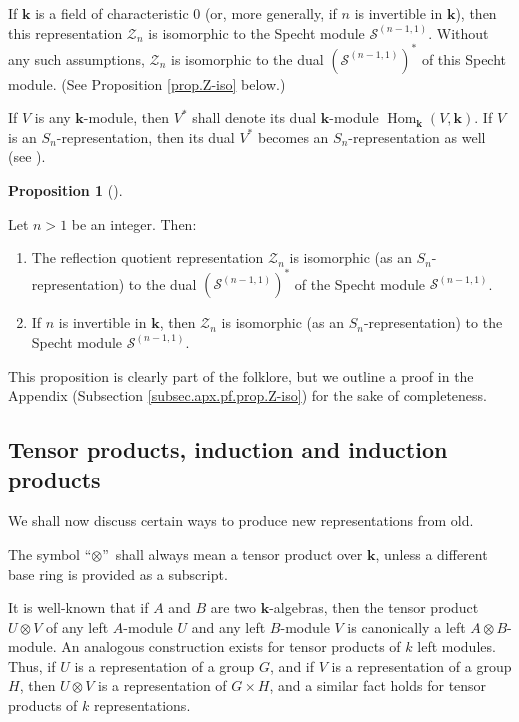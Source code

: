 \documentclass[numbers=enddot,12pt,final,onecolumn,notitlepage]{scrartcl}%
\theoremstyle{definition}
\newtheorem{prop}[theo]{Proposition}
\newenvironment{proposition}[1][]
{\begin{prop}[#1]\begin{leftbar}}
{\end{leftbar}\end{prop}}
\begin{document}
\begin{enumerate}
If $\mathbf{k}$ is a field of characteristic $0$ (or, more generally, if $n$
is invertible in $\mathbf{k}$), then this representation $\mathcal{Z}_{n}$ is
isomorphic to the Specht module $\mathcal{S}^{\left(  n-1,1\right)  }$.
Without any such assumptions, $\mathcal{Z}_{n}$ is isomorphic to the dual
$\left(  \mathcal{S}^{\left(  n-1,1\right)  }\right)  ^{\ast}$ of this Specht
module. (See Proposition \ref{prop.Z-iso} below.)
\end{enumerate}

If $V$ is any $\mathbf{k}$-module, then $V^{\ast}$ shall denote its dual
$\mathbf{k}$-module $\operatorname*{Hom}\nolimits_{\mathbf{k}}\left(
V,\mathbf{k}\right)  $. If $V$ is an $S_{n}$-representation, then its dual
$V^{\ast}$ becomes an $S_{n}$-representation as well (see \cite[\S 5.19.3]%
{sga}).

\begin{proposition}
\label{prop.Z-iso}Let $n>1$ be an integer. Then:

\begin{enumerate}
\item[\textbf{(a)}] The reflection quotient representation $\mathcal{Z}_{n}$
is isomorphic (as an $S_{n}$-representation) to the dual $\left(
\mathcal{S}^{\left(  n-1,1\right)  }\right)  ^{\ast}$ of the Specht module
$\mathcal{S}^{\left(  n-1,1\right)  }$.

\item[\textbf{(b)}] If $n$ is invertible in $\mathbf{k}$, then $\mathcal{Z}%
_{n}$ is isomorphic (as an $S_{n}$-representation) to the Specht module
$\mathcal{S}^{\left(  n-1,1\right)  }$.
\end{enumerate}
\end{proposition}

This proposition is clearly part of the folklore, but we outline a proof in
the Appendix (Subsection \ref{subsec.apx.pf.prop.Z-iso}) for the sake of completeness.

\subsection{Tensor products, induction and induction products}

We shall now discuss certain ways to produce new representations from old.

The symbol \textquotedblleft$\otimes$\textquotedblright\ shall always mean a
tensor product over $\mathbf{k}$, unless a different base ring is provided as
a subscript.

It is well-known that if $A$ and $B$ are two $\mathbf{k}$-algebras, then the
tensor product $U\otimes V$ of any left $A$-module $U$ and any left $B$-module
$V$ is canonically a left $A\otimes B$-module. An analogous construction
exists for tensor products of $k$ left modules. Thus, if $U$ is a
representation of a group $G$, and if $V$ is a representation of a group $H$,
then $U\otimes V$ is a representation of $G\times H$, and a similar fact holds
for tensor products of $k$ representations.
\end{document}
